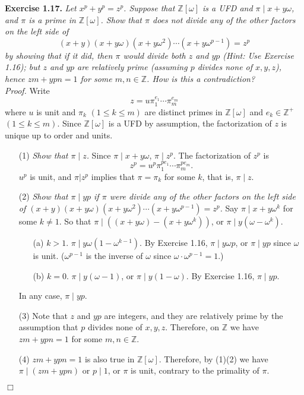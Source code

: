 \documentclass{article}
\begin{document}
\textbf{Exercise 1.17.}
\emph{Let $x^p + y^p = z^p$.
Suppose that $\mathbb{Z}[\omega]$ is a UFD and $\pi \mid x + y\omega$,
and $\pi$ is a prime in $\mathbb{Z}[\omega]$.
Show that $\pi$ does not divide any of the other factors on the left side of
$$(x+y)(x+y\omega)(x+y\omega^2) \cdots (x+y\omega^{p-1}) = z^p$$
by showing that if it did, then $\pi$ would divide both $z$ and $yp$
(Hint: Use Exercise 1.16);
but $z$ and $yp$ are relatively prime (assuming $p$ divides none of $x, y, z$),
hence $zm + ypn = 1$ for some $m, n \in \mathbb{Z}$.
How is this a contradiction? } \\

\emph{Proof.}
Write $$z = u {\pi}_1^{e_1} \cdots {\pi}_m^{e_m}$$ where
$u$ is unit and $\pi_k$ $(1 \leq k \leq m)$ are distinct primes in $\mathbb{Z}[\omega]$ and
$e_k \in \mathbb{Z}^+$ $(1 \leq k \leq m)$.
Since $\mathbb{Z}[\omega]$ is a UFD by assumption,
the factorization of $z$ is unique up to order and units.
\begin{enumerate}
\item[(1)]
\emph{Show that $\pi \mid z$.}
Since $\pi \mid x + y\omega$, $\pi \mid z^p$.
The factorization of $z^p$ is
$$z^p = u^p {\pi}_1^{pe_1} \cdots {\pi}_m^{pe_m}.$$
$u^p$ is unit, and $\pi | z^p$ implies that $\pi = \pi_k$ for some $k$,
that is, $\pi \mid z$.
\item[(2)]
\emph{Show that $\pi \mid yp$ if $\pi$ were divide any of
the other factors on the left side of
$(x+y)(x+y\omega)(x+y\omega^2) \cdots (x+y\omega^{p-1}) = z^p$.}
Say $\pi \mid x+y\omega^k$ for some $k \neq 1$.
So that $\pi \mid ((x+y\omega) - (x+y\omega^k))$,
or $\pi \mid y(\omega - \omega^k)$.
  \begin{enumerate}
  \item[(a)]
  $k > 1$. $\pi \mid y\omega(1 - \omega^{k-1})$.
  By Exercise 1.16, $\pi \mid y\omega p$, or $\pi \mid yp$ since $\omega$ is unit.
  ($\omega^{p-1}$ is the inverse of $\omega$ since $\omega \cdot \omega^{p-1} = 1$.)
  \item[(b)]
  $k = 0$. $\pi \mid y(\omega - 1)$, or $\pi \mid y(1 - \omega)$.
  By Exercise 1.16, $\pi \mid yp$.
  \end{enumerate}
In any case, $\pi \mid yp$.
\item[(3)]
Note that $z$ and $yp$ are integers, and they are relatively prime by the assumption
that $p$ divides none of $x, y, z$.
Therefore, on $\mathbb{Z}$ we have $zm + ypn = 1$ for some $m, n \in \mathbb{Z}$.
\item[(4)]
$zm + ypn = 1$ is also true in $\mathbb{Z}[\omega]$.
Therefore, by (1)(2) we have $\pi \mid (zm + ypn)$ or $p \mid 1$,
or $\pi$ is unit, contrary to the primality of $\pi$.
\end{enumerate}
$\Box$ \\\\
\end{document}
